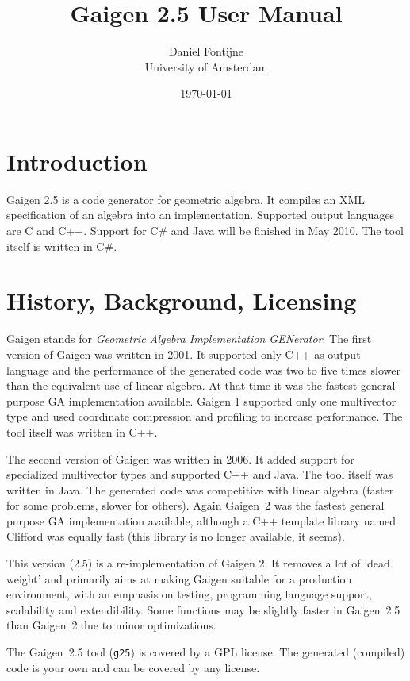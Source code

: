 \documentclass[10pt, a4paper]{article}
\begin{document}
\title{Gaigen 2.5 User Manual}
\author{
Daniel Fontijne\\University of Amsterdam 
}
\date{\today}
\maketitle

\section{Introduction}

Gaigen 2.5 is a code generator for geometric algebra. It compiles an XML specification
of an algebra into an implementation. Supported output languages are C and C++.
Support for C\# and Java will be finished in May 2010. The tool itself is written in C\#.

\section{History, Background, Licensing}

Gaigen stands for \emph{Geometric Algebra Implementation GENerator}.
The first version of Gaigen was written in 2001. It supported only C++ as output language
and the performance of the generated code was two to five times slower than the equivalent
use of linear algebra. At that time it was the fastest general purpose GA implementation available. 
Gaigen 1 supported only one multivector type and used coordinate  compression and profiling to increase performance.
The tool itself was written in C++.

The second version of Gaigen was written in 2006. It added support for specialized multivector
types and supported C++ and Java. The tool itself was written in Java.
The generated code was competitive with linear algebra (faster for some problems, slower for others).
Again Gaigen~2 was the fastest general purpose GA implementation available, although a 
C++ template library named Clifford was equally fast (this library is no longer available,
it seems).

This version (2.5) is a re-implementation of Gaigen 2. It removes a lot of 'dead weight' and
primarily aims at making Gaigen suitable for a production environment, with an emphasis on
testing, programming language support, scalability and extendibility. Some functions may be
slightly faster in Gaigen~2.5 than Gaigen~2 due to minor optimizations.

The Gaigen~2.5 tool ({\tt g25}) is covered by a GPL license. 
The generated (compiled) code is your own and can be covered by any license.
\end{document}
